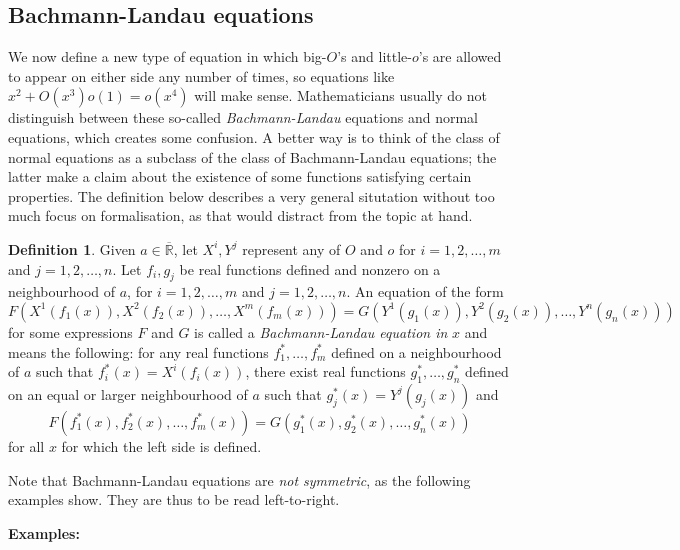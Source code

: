 \documentclass{article}
\theoremstyle{definition}
\newtheorem{definition}{Definition}
\newcommand\RRE{\overline{\mathbb R}}
\begin{document}
\subsection{Bachmann-Landau equations}\label{ssec:equations}

We now define a new type of equation in which big-$O$'s and little-$o$'s are allowed to appear on either side any number of times, so equations like $x^2 + O(x^3)o(1) = o(x^4)$ will make sense.
Mathematicians usually do not distinguish between these so-called \textit{Bachmann-Landau} equations and normal equations, which creates some confusion.
A better way is to think of the class of normal equations as a subclass of the class of Bachmann-Landau equations; the latter make a claim about the existence of some functions satisfying certain properties.
The definition below describes a very general situtation without too much focus on formalisation, as that would distract from the topic at hand.

\begin{definition}
    Given \(a\in\RRE\), let \(X^i, Y^j\) represent any of \(O\) and \(o\) for \(i=1,2,\ldots,m\) and \(j=1,2,\ldots,n\).
    Let \(f_i, g_j\) be real functions defined and nonzero on a neighbourhood of \(a\), for \(i=1,2,\ldots,m\) and \(j=1,2,\ldots,n\).
    An equation of the form
    \[F(X^1(f_1(x)), X^2(f_2(x)), \ldots, X^m(f_m(x))) = G(Y^1(g_1(x)), Y^2(g_2(x)), \ldots, Y^n(g_n(x)))\]
    for some expressions \(F\) and \(G\) is called a \textit{Bachmann-Landau equation in} \(x\) and means the following: for any real functions \(f_1^*, \ldots, f_m^*\) defined on a neighbourhood of \(a\) such that \(f_i^*(x) = X^i(f_i(x))\), there exist real functions \(g_1^*, \ldots, g_n^*\) defined on an equal or larger neighbourhood of \(a\) such that \(g_j^*(x) = Y^j(g_j(x))\) and
    \[F(f_1^*(x), f_2^*(x), \ldots, f_m^*(x)) = G(g_1^*(x), g_2^*(x), \ldots, g_n^*(x))\]
    for all \(x\) for which the left side is defined.
\end{definition}

Note that Bachmann-Landau equations are \textit{not symmetric}, as the following examples show.
They are thus to be read left-to-right.

\textbf{Examples:}
\end{document}
